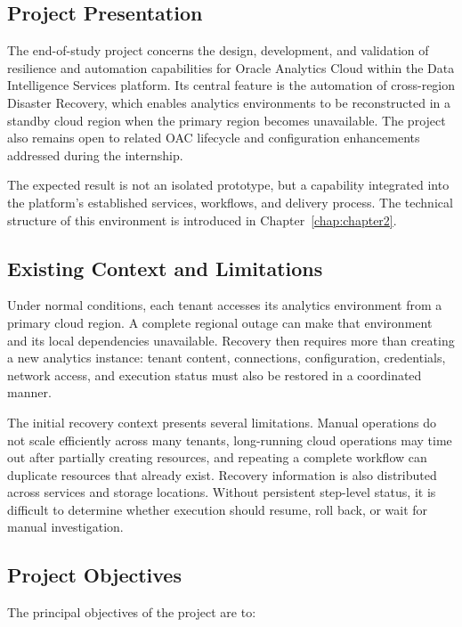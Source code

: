 \subsection{Project Presentation}

The end-of-study project concerns the design, development, and validation of
resilience and automation capabilities for Oracle Analytics Cloud within the
Data Intelligence Services platform. Its central feature is the automation of
cross-region Disaster Recovery, which enables analytics environments to be
reconstructed in a standby cloud region when the primary region becomes
unavailable. The project also remains open to related OAC lifecycle and
configuration enhancements addressed during the internship.

The expected result is not an isolated prototype, but a capability integrated
into the platform's established services, workflows, and delivery process. The
technical structure of this environment is introduced in
Chapter~\ref{chap:chapter2}.

\subsection{Existing Context and Limitations}

Under normal conditions, each tenant accesses its analytics environment from a
primary cloud region. A complete regional outage can make that environment and
its local dependencies unavailable. Recovery then requires more than creating
a new analytics instance: tenant content, connections, configuration,
credentials, network access, and execution status must also be restored in a
coordinated manner.

The initial recovery context presents several limitations. Manual operations do
not scale efficiently across many tenants, long-running cloud operations may
time out after partially creating resources, and repeating a complete workflow
can duplicate resources that already exist. Recovery information is also
distributed across services and storage locations. Without persistent
step-level status, it is difficult to determine whether execution should
resume, roll back, or wait for manual investigation.

\subsection{Project Objectives}

The principal objectives of the project are to:

